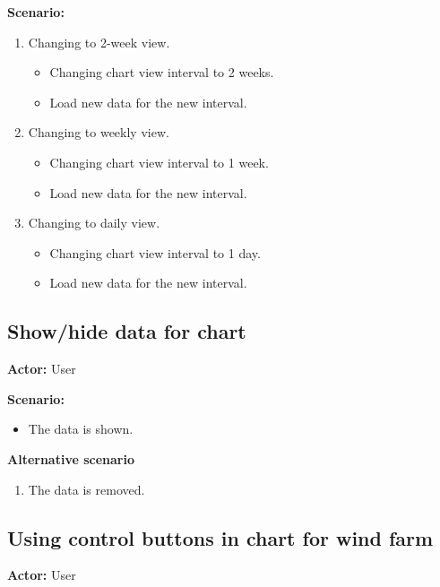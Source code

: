 \textbf{Scenario:}
\begin{enumerate}
\item Changing to 2-week view.
\begin{itemize}
\item Changing chart view interval to 2 weeks.
\item Load new data for the new interval.
\end{itemize}
\item Changing to weekly view.
\begin{itemize}
\item Changing chart view interval to 1 week.
\item Load new data for the new interval.
\end{itemize}
\item Changing to daily view.
\begin{itemize}
\item Changing chart view interval to 1 day.
\item Load new data for the new interval.
\end{itemize}
\end{enumerate}

\subsection{Show/hide data for chart}
\textbf{Actor:} User

\textbf{Scenario:}
\begin{itemize}
\item The data is shown.
\end{itemize}
\textbf{Alternative scenario}
\begin{enumerate}
\item The data is removed.
\end{enumerate}

\subsection{Using control buttons in chart for wind farm}
\textbf{Actor:} User

